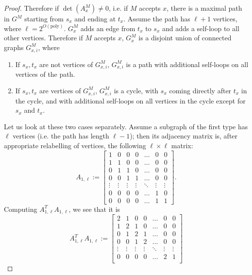 \documentclass[english]{article}
\numberwithin{equation}{section}
\numberwithin{figure}{section}
\theoremstyle{plain}
\theoremstyle{definition}
\theoremstyle{plain}
\theoremstyle{definition}
\theoremstyle{remark}
\theoremstyle{remark}
\theoremstyle{plain}
\begin{document}
\begin{proof}
Therefore if $\det(A^M_x) \neq 0$, i.e. if $M$ accepts $x$, there is a maximal path in $G^M$ starting from $s_x$ and ending at $t_x$. Assume the path has $\ell+1$ vertices, where $\ell = 2^{O(\text{poly})}$. $G^M_x$ adds an edge from $t_x$ to $s_x$ and adds a self-loop to all other vertices. Therefore if $M$ accepts $x$, $G^M_x$ is a disjoint union of connected graphs $G^M_{x,i}$, where
\begin{enumerate}
\item If $s_x, t_x$ are not vertices of $G^M_{x,i}$, $G^M_{x,i}$ is a path with additional self-loops on all vertices of the path.
\item If $s_x, t_x$ are vertices of $G^M_{x,i}$, $G^M_{x,i}$ is a cycle, with $s_x$ coming directly after $t_x$ in the cycle, and with additional self-loops on all vertices in the cycle except for $s_x$ and $t_x$.
\end{enumerate}
Let us look at these two cases separately. Assume a subgraph of the first type has $\ell$ vertices (i.e. the path has length $\ell-1$); then its adjacency matrix is, after appropriate relabelling of vertices, the following $\ell \times \ell$ matrix:
\begin{equation}
A_{1,\ell} := 
\begin{bmatrix}
    1 & 0 & 0 & 0 & \dots  & 0  & 0 \\
    1 & 1 & 0 & 0 &\dots  & 0 & 0 \\
    0 & 1 & 1 & 0 & \dots  & 0 & 0 \\
     0 & 0 & 1 & 1 & \dots  & 0 & 0 \\
    \vdots & \vdots & \vdots & \vdots & \ddots & \vdots & \vdots \\
    0 & 0 & 0 & 0 & \dots  & 1 & 0 \\
    0 & 0 & 0 & 0 & \dots  & 1 & 1
\end{bmatrix}.
\end{equation}
Computing $A_{1,\ell}^T A_{1,\ell}$, we see that it is
\begin{equation} \label{eq:psd_mat}
A_{1,\ell}^T A_{1,\ell} := 
\begin{bmatrix}
    2 & 1 & 0 & 0 & \dots  & 0  & 0 \\
    1 & 2 & 1 & 0 &\dots  & 0 & 0 \\
    0 & 1 & 2 & 1 & \dots  & 0 & 0 \\
     0 & 0 & 1 & 2 & \dots  & 0 & 0 \\
    \vdots & \vdots & \vdots & \vdots & \ddots & \vdots & \vdots \\
    0 & 0 & 0 & 0 & \dots  & 2 & 1 \\

\end{bmatrix}
\end{equation}
\end{proof}
\end{document}
